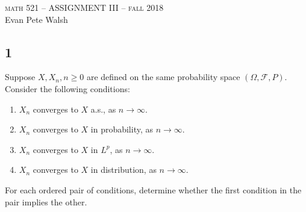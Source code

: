 \documentclass[12pt]{article}
\newcommand\toinf{\rightarrow\infty}
\begin{document}
\thispagestyle{empty}
\begin{center}
  \Large \textsc{math 521 -- ASSIGNMENT III -- fall 2018} \\ 
  \vspace{5mm}
  \large Evan Pete Walsh
\end{center}


\subsection*{1}
\begin{tcolorbox}
  Suppose $X, X_n, n\geq 0$ are defined on the same probability space $(\Omega, \mathcal{F}, P)$. Consider the following conditions:
  \begin{enumerate}[label=(\roman*)]
    \item $X_n$ converges to $X$ a.s., as $n \rightarrow \infty$.
    \item $X_n$ converges to $X$ in probability, as $n \toinf$.
    \item $X_n$ converges to $X$ in $L^p$, as $n \toinf$.
    \item $X_n$ converges to $X$ in distribution, as $n \toinf$.
  \end{enumerate}
  For each ordered pair of conditions, determine whether the first condition in the pair implies the other.
\end{tcolorbox}
\end{document}
